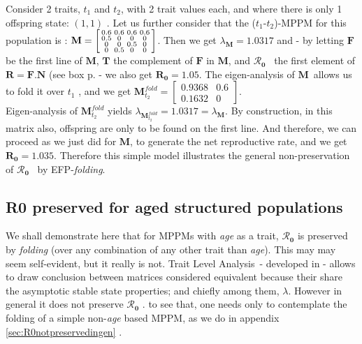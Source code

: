 \documentclass[10pt,a4paper]{article}
\newcommand{\M}{$\mathbf{M}$}
\newcommand{\lam}{$\lambda$}
\newcommand{\Rzero}{$\boldsymbol{\mathcal{R}_{0}}$  }
\newcommand{\TLA}{Trait Level Analysis}
\newcommand{\chapii}{\citep{Coste2017}}
\begin{document}
Consider 2 traits, $t_{1}$ and $t_{2}$, with 2 trait values each, and where there is only 1 offspring state: $(1,1)$ .
Let us further consider that the ($t_{1}$-$t_{2}$)-MPPM for this population is : $\mathbf{M}=\begin{bsmallmatrix}
0.6 & 0.6 & 0.6& 0.6\\0.5 & 0 & 0& 0 \\ 0 & 0 & 0.5 & 0 \\ 0 & 0.5 & 0  & 0 \end{bsmallmatrix}$. Then we get $\lambda_{\mathbf{M}}=1.0317$ and - by letting $\mathbf{F}$ be the first line of \M, $\mathbf{T}$ the complement of $\mathbf{F}$ in \M, and \Rzero\ the first element of $\mathbf{R}=\mathbf{F}.\mathbf{N}$ (see box p. \pageref{box:noteonR0} - we also get $\mathbf{R_{0}}=1.05$. The eigen-analysis of \M\ allows us to fold it over $t_{1}$ \citep[see][]{Coste2018}, and we get $\mathbf{M}_{t_{2}}^{fold}=\begin{bmatrix}
0.9368 & 0.6 \\0.1632 & 0  \end{bmatrix}$.\\

Eigen-analysis of $\mathbf{M}_{t_{2}}^{fold}$ yields $\lambda_{\mathbf{M}_{t_{2}}^{fold}}=1.0317=\lambda_{\mathbf{M}}$. By construction, in this matrix also, offspring are only to be found on the first line. And therefore, we can proceed as we just did for \M, to generate the net reproductive rate, and we get $\mathbf{R_{0}}=1.035$. Therefore this simple model illustrates the general non-preservation of \Rzero\ by EFP-\emph{folding}.



\subsection{R0 preserved for aged structured populations}
\label{sec:R0preservedforagestruc}
\label{sec:preseveRzero}

We shall demonstrate here that for MPPMs with \emph{age} as a trait, \Rzero is preserved by \emph{folding} (over any combination of any other trait than \emph{age}). This may may seem self-evident, but it really is not. \TLA\ - developed in \chapii - allows to draw conclusion between matrices considered equivalent because their share the asymptotic stable state properties; and chiefly among them, \lam.  However in general it does not preserve \Rzero. to see that, one needs only to contemplate the folding of a simple non-\emph{age} based MPPM, as we do in appendix \ref{sec:R0notpreservedingen} . \\
\end{document}
